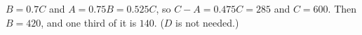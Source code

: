 $B=0.7C$ and $A=0.75B=0.525C$, so $C-A=0.475C=285$ and $C=600$. Then $B=420$, and one third of it is $\boxed{140}$. ($D$ is not needed.)
